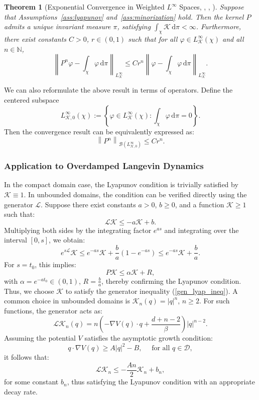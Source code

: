 \documentclass[11pt, twoside]{report}
\newtheorem{theorem}{Theorem}[section]
\begin{document}
\begin{theorem}[Exponential Convergence in Weighted $L^\infty$ Spaces,  \texorpdfstring{\cite[Theorem~15.0.1]{meyn2012-oq}}{}, \texorpdfstring{\cite[Theorem~1.2]{Hairer2011-of}}{}, \texorpdfstring{\cite[Theorem 2.25]{Lelievre2016-hx}}]
\label{thm:exp-conv-linf}
Suppose that Assumptions~\ref{ass:lyapunov} and~\ref{ass:minorization} hold. Then the kernel $P$ admits a unique invariant measure $\pi$, satisfying $\int_\chi \mathcal{K} \, \mathrm{d}\pi < \infty$. Furthermore, there exist constants $C > 0$, $r \in (0,1)$ such that for all $\varphi \in L^\infty_\mathcal{K}(\chi)$ and all $n \in \mathbb{N}$,
\[
\left\|P^n \varphi - \int_\chi \varphi \, \mathrm{d}\pi \right\|_{L^\infty_\mathcal{K}} \leq C r^n \left\|\varphi - \int_\chi \varphi \, \mathrm{d}\pi \right\|_{L^\infty_\mathcal{K}}.
\]
\end{theorem}
We can also reformulate the above result in terms of operators. Define the centered subspace
\[
L^\infty_{\mathcal{K},0}(\chi) := \left\{ \varphi \in L^\infty_{\mathcal{K}}(\chi) : \int_\chi \varphi \, \mathrm{d}\pi = 0 \right\}.
\]
Then the convergence result can be equivalently expressed as:
\[
\left\| P^n \right\|_{\mathcal{B}(L^\infty_{\mathcal{K},0})} \leq C r^n.
\]

\subsubsection{Application to Overdamped Langevin Dynamics}

In the compact domain case, the Lyapunov condition is trivially satisfied by $\mathcal{K} \equiv 1$. In unbounded domains, the condition can be verified directly using the generator $\mathcal{L}$. Suppose there exist constants $a > 0$, $b \geq 0$, and a function $\mathcal{K} \geq 1$ such that:
\begin{equation} \label{gen_lyap_ineq}
    \mathcal{L}\mathcal{K} \leq -a \mathcal{K} + b.
\end{equation}
Multiplying both sides by the integrating factor $e^{as}$ and integrating over the interval $[0, s]$, we obtain:
\[
e^{s \mathcal{L}} \mathcal{K} \leq e^{-as} \mathcal{K} + \frac{b}{a}(1 - e^{-as}) \leq e^{-as} \mathcal{K} + \frac{b}{a}.
\]
For $s = t_0$, this implies:
\[
P \mathcal{K} \leq \alpha \mathcal{K} + R,
\]
with $\alpha = e^{-a t_0} \in (0,1)$, $R = \frac{b}{a}$, thereby confirming the Lyapunov condition. Thus, we choose $\mathcal{K}$ to satisfy the generator inequality (\ref{gen_lyap_ineq}). A common choice in unbounded domains is $\mathcal{K}_n(q) = |q|^n$, $n \geq 2$. For such functions, the generator acts as:
\[
\mathcal{L} \mathcal{K}_n(q) = n \left( -\nabla V(q) \cdot q + \frac{d + n - 2}{\beta} \right) |q|^{n - 2}.
\]
Assuming the potential $V$ satisfies the asymptotic growth condition:
\[
q \cdot \nabla V(q) \geq A |q|^2 - B, \quad \text{ for all } q \in \mathcal{D},
\]
it follows that:
\[
\mathcal{L} \mathcal{K}_n \leq -\frac{A n}{2} \mathcal{K}_n + b_n,
\]
for some constant $b_n$, thus satisfying the Lyapunov condition with an appropriate decay rate.
\end{document}
